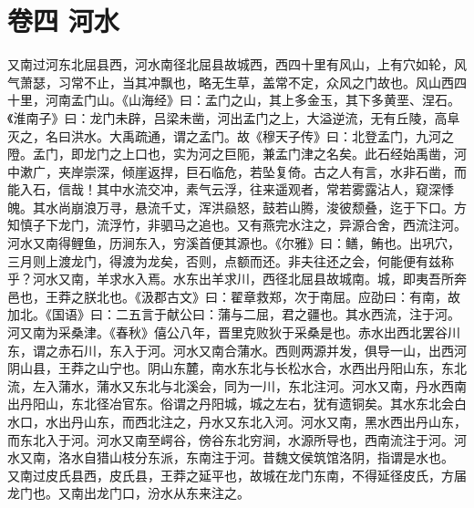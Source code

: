 \documentclass[12pt,UTF8]{ctexbook}
\begin{document}
\chapter{卷四 河水 }
又南过河东北屈县西，河水南径北屈县故城西，西四十里有风山，上有穴如轮，风气萧瑟，习常不止，当其冲飘也，略无生草，盖常不定，众风之门故也。风山西四十里，河南孟门山。《山海经》曰：孟门之山，其上多金玉，其下多黄垩、涅石。《淮南子》曰：龙门未辟，吕梁未凿，河出孟门之上，大溢逆流，无有丘陵，高阜灭之，名曰洪水。大禹疏通，谓之孟门。故《穆天子传》曰：北登孟门，九河之隥。孟门，即龙门之上口也，实为河之巨阨，兼孟门津之名矣。此石经始禹凿，河中漱广，夹岸崇深，倾崖返捍，巨石临危，若坠复倚。古之人有言，水非石凿，而能入石，信哉！其中水流交冲，素气云浮，往来遥观者，常若雾露沾人，窥深悸魄。其水尚崩浪万寻，悬流千丈，浑洪赑怒，鼓若山腾，浚彼颓叠，迄于下口。方知慎子下龙门，流浮竹，非驷马之追也。又有燕完水注之，异源合舍，西流注河。河水又南得鲤鱼，历涧东入，穷溪首便其源也。《尔雅》曰：鳝，鲔也。出巩穴，三月则上渡龙门，得渡为龙矣，否则，点额而还。非夫往还之会，何能便有兹称乎？河水又南，羊求水入焉。水东出羊求川，西径北屈县故城南。城，即夷吾所奔邑也，王莽之朕北也。《汲郡古文》曰：翟章救郑，次于南屈。应劭曰：有南，故加北。《国语》曰：二五言于献公曰：蒲与二屈，君之疆也。其水西流，注于河。河又南为采桑津。《春秋》僖公八年，晋里克败狄于采桑是也。赤水出西北罢谷川东，谓之赤石川，东入于河。河水又南合蒲水。西则两源并发，俱导一山，出西河阴山县，王莽之山宁也。阴山东麓，南水东北与长松水合，水西出丹阳山东，东北流，左入蒲水，蒲水又东北与北溪会，同为一川，东北注河。河水又南，丹水西南出丹阳山，东北径冶官东。俗谓之丹阳城，城之左右，犹有遗铜矣。其水东北会白水口，水出丹山东，而西北注之，丹水又东北入河。河水又南，黑水西出丹山东，而东北入于河。河水又南至崿谷，傍谷东北穷涧，水源所导也，西南流注于河。河水又南，洛水自猎山枝分东派，东南注于河。昔魏文侯筑馆洛阴，指谓是水也。
又南过皮氏县西，皮氏县，王莽之延平也，故城在龙门东南，不得延径皮氏，方届龙门也。又南出龙门口，汾水从东来注之。
\end{document}
